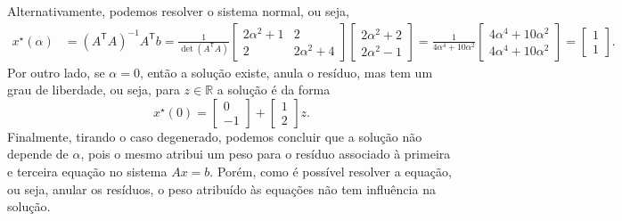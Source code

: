 \documentclass{article}
\newcommand{\R}{\mathbb{R}}
\newcommand{\T}{\mathsf{T}}
\begin{document}
\begin{enumerate}[label=$\blacktriangleright$ {\bf Questão \arabic*:},series=exerc,align=left]
\begin{enumerate}[resume*=q2]
\begin{framed}
Alternativamente, podemos resolver o sistema normal, ou seja,
\begin{align*}
    x^\star(\alpha) &= (A^\T A)^{-1} A^\T b
        = \frac{1}{\det(A^\T A)}
        \begin{bmatrix}
            2\alpha^2+1 & 2 \\
            2 & 2\alpha^2 + 4
        \end{bmatrix}
        \begin{bmatrix}
            2\alpha^2+2 \\
            2\alpha^2-1
        \end{bmatrix}
        = \frac{1}{4\alpha^4 + 10\alpha^2}
        \begin{bmatrix}
            4\alpha^4 + 10\alpha^2 \\
            4\alpha^4 + 10\alpha^2
        \end{bmatrix}
        = \begin{bmatrix} 1\\ 1 \end{bmatrix}.
\end{align*}
Por outro lado, se $\alpha = 0$, então a solução existe, anula o resíduo, mas tem um grau de liberdade, ou seja, para $z\in\R$ a solução é da forma
\[
    x^\star(0) = \begin{bmatrix} 0\\ -1 \end{bmatrix} + \begin{bmatrix} 1\\ 2 \end{bmatrix} z.
\]
Finalmente, tirando o caso degenerado, podemos concluir que a solução não depende de $\alpha$, pois o mesmo atribui um peso para o resíduo associado à primeira e terceira equação no sistema $Ax=b$. Porém, como é possível resolver a equação, ou seja, anular os resíduos, o peso atribuído às equações não tem influência na solução.
\vspace{5cm}
\end{framed}
\end{enumerate}
\end{enumerate}

\pagebreak
\end{document}
